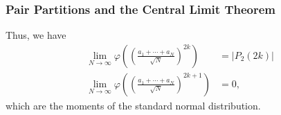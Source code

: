 \documentclass{beamer}
\begin{document}
\begin{frame}
  \frametitle{Pair Partitions and the Central Limit Theorem}
  Thus, we have
  \begin{align*}
    \lim_{N\rightarrow\infty} \varphi\left( \left( \frac{a_1 + \cdots + a_N}{\sqrt{N}} \right)^{2k} \right) &= \left\vert P_2\left( 2k \right) \right\vert\\
    \lim_{N\rightarrow\infty} \varphi\left( \left( \frac{a_1 + \cdots + a_N}{\sqrt{N}} \right)^{2k+1} \right) &= 0,
  \end{align*}
  which are the moments of the standard normal distribution.
\end{frame}
%
%
\end{document}
